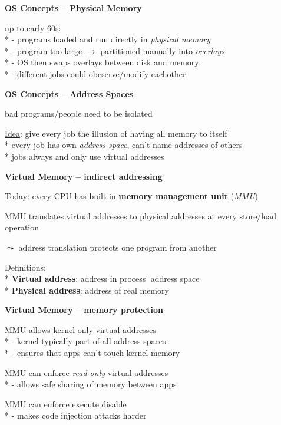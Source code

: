\textbf{OS Concepts -- Physical Memory}
\begin{items}
	\item up to early 60s: \\* 
		- programs loaded and run directly in \emph{physical memory}
		\\*
		- program too large \( \to \) partitioned manually into \emph{overlays}
		\\*
		- OS then swaps overlays between disk and memory
		\\*
		- different jobs could obeserve/modify eachother
\end{items}

\textbf{OS Concepts -- Address Spaces}
\begin{items}
	\item bad programs/people need to be isolated
	\item \underline{Idea}: give every job the illusion of having all memory to itself
		\\*
		every job has own \emph{address space}, can't name addresses of others
		\\*
		jobs always and only use virtual addresses
\end{items}

\textbf{Virtual Memory -- indirect addressing}
\begin{items}
	\item Today: every CPU has built-in \textbf{memory management unit} (\emph{MMU})
	\item MMU translates virtual addresses to physical addresses at every store/load operation
	\item \( \leadsto \) address translation protects one program from another
	\item Definitions:
		\\*
		\textbf{Virtual address}: address in process' address space
		\\*
		\textbf{Physical address}: address of real memory
\end{items}

\textbf{Virtual Memory -- memory protection}
\begin{items}
	\item MMU allows kernel-only virtual addresses
		\\*
		- kernel typically part of all address spaces
		\\*
		- ensures that apps can't touch kernel memory
	\item MMU can enforce \emph{read-only} virtual addresses
		\\*
		- allows safe sharing of memory between apps
	\item MMU can enforce execute disable
		\\*
		- makes code injection attacks harder
\end{items}

